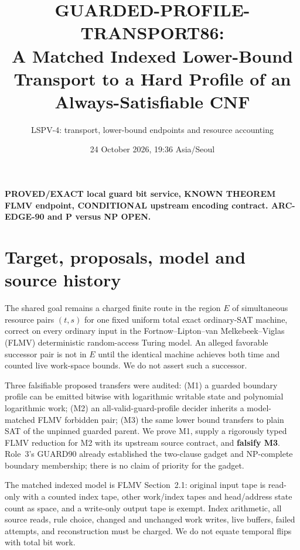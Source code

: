 \documentclass[11pt]{article}
\title{GUARDED-PROFILE-TRANSPORT86:\\A Matched Indexed Lower-Bound Transport to a Hard Profile of an Always-Satisfiable CNF}
\author{LSPV-4: transport, lower-bound endpoints and resource accounting}
\date{24 October 2026, 19:36 Asia/Seoul}
\begin{document}
\maketitle
\begin{center}
\textbf{PROVED/EXACT local guard bit service, KNOWN THEOREM FLMV endpoint, CONDITIONAL upstream encoding contract. ARC-EDGE-90 and P versus NP OPEN.}
\end{center}

\section{Target, proposals, model and source history}
The shared goal remains a charged finite route in the region $E$ of simultaneous resource pairs $(t,s)$ for one fixed uniform total exact ordinary-SAT machine, correct on every ordinary input in the Fortnow--Lipton--van Melkebeek--Viglas (FLMV) deterministic random-access Turing model. An alleged favorable successor pair is not in $E$ until the identical machine achieves both time and counted live work-space bounds. We do not assert such a successor.

Three falsifiable proposed transfers were audited: (M1) a guarded boundary profile can be emitted bitwise with logarithmic writable state and polynomial logarithmic work; (M2) an all-valid-guard-profile decider inherits a model-matched FLMV forbidden pair; (M3) the same lower bound transfers to plain SAT of the unpinned guarded parent. We prove M1, supply a rigorously typed FLMV reduction for M2 with its upstream source contract, and \textbf{falsify M3}. Role~3's GUARD90 already established the two-clause gadget and NP-complete boundary membership; there is no claim of priority for the gadget.

The matched indexed model is FLMV Section~2.1: original input tape is read-only with a counted index tape, other work/index tapes and head/address state count as space, and a write-only output tape is exempt. Index arithmetic, all source reads, rule choice, changed and unchanged work writes, live buffers, failed attempts, and reconstruction must be charged. We do not equate temporal flips with total bit work.
\end{document}
